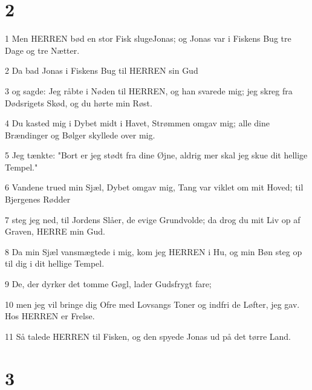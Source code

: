 \chapter{2}

\par 1 Men HERREN bød en stor Fisk slugeJonas; og Jonas var i Fiskens Bug tre Dage og tre Nætter.
\par 2 Da bad Jonas i Fiskens Bug til HERREN sin Gud
\par 3 og sagde: Jeg råbte i Nøden til HERREN, og han svarede mig; jeg skreg fra Dødsrigets Skød, og du hørte min Røst.
\par 4 Du kasted mig i Dybet midt i Havet, Strømmen omgav mig; alle dine Brændinger og Bølger skyllede over mig.
\par 5 Jeg tænkte: "Bort er jeg stødt fra dine Øjne, aldrig mer skal jeg skue dit hellige Tempel."
\par 6 Vandene trued min Sjæl, Dybet omgav mig, Tang var viklet om mit Hoved; til Bjergenes Rødder
\par 7 steg jeg ned, til Jordens Slåer, de evige Grundvolde; da drog du mit Liv op af Graven, HERRE min Gud.
\par 8 Da min Sjæl vansmægtede i mig, kom jeg HERREN i Hu, og min Bøn steg op til dig i dit hellige Tempel.
\par 9 De, der dyrker det tomme Gøgl, lader Gudsfrygt fare;
\par 10 men jeg vil bringe dig Ofre med Lovsangs Toner og indfri de Løfter, jeg gav. Hos HERREN er Frelse.
\par 11 Så talede HERREN til Fisken, og den spyede Jonas ud på det tørre Land.

\chapter{3}


